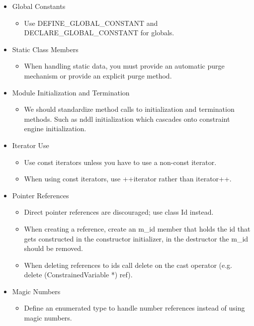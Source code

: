 \documentclass[10pt, letterpaper, twoside]{article}
\begin{document}
{\begin{itemize}
\item[] Global Constants
 \begin{itemize}
  \item	Use DEFINE\_GLOBAL\_CONSTANT and DECLARE\_GLOBAL\_CONSTANT for globals.
 \end{itemize}

\item[] Static Class Members
 \begin{itemize}
  \item	When handling static data, you must provide an automatic purge mechanism or provide an explicit purge method.
 \end{itemize}

\item[] Module Initialization and Termination
 \begin{itemize}
  \item	We should standardize method calls to initialization and termination methods.  Such as nddl initialization which cascades onto constraint engine initialization.
 \end{itemize}

\item[] Iterator Use
 \begin{itemize}	 
  \item	 Use const iterators unless you have to use a non-const iterator. 
  \item	 When using const iterators, use ++iterator rather than iterator++.
 \end{itemize}

\item[] Pointer References
 \begin{itemize}	
  \item	Direct pointer references are discouraged; use class Id instead.
  \item	When creating a reference, create an m\_id member that holds the id that gets constructed in the constructor initializer, in the destructor the m\_id should be removed.
  \item	When deleting references to ids call delete on the cast operator (e.g. delete (ConstrainedVariable *) ref).
 \end{itemize}

\item[] Magic Numbers
 \begin{itemize}      
  \item	Define an enumerated type to handle number references instead of using magic numbers.
 \end{itemize}


\end{itemize}}
\end{document}
